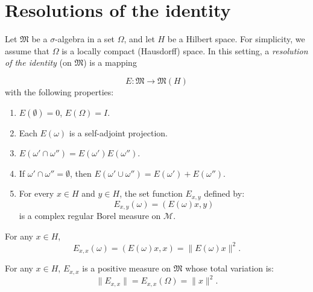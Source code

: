 \section{Resolutions of the identity}

\begin{definition}[12.17]
  Let $\mathfrak{M}$ be a $\sigma$-algebra in a set $\Omega$, and let $H$ be a Hilbert space.
  For simplicity, we assume that $\Omega$ is a locally compact (Hausdorff) space.
  In this setting, a \emph{resolution of the identity} (on $\mathfrak{M}$) is a mapping

  \[
    E: \mathfrak{M} \to \mathfrak{M}(H)
  \]
  with the following properties:

  \begin{enumerate}
    \item \label{itm:Ra} \( E(\emptyset) = 0\), \(E(\Omega) = I\).
    \item \label{itm:Rb}  Each \( E(\omega) \) is a self-adjoint projection.
    \item \label{itm:Rc} \( E(\omega' \cap \omega'') = E(\omega')E(\omega'')\).
    \item \label{itm:Rd}  If \( \omega' \cap \omega'' = \emptyset \), then \( E(\omega' \cup \omega'') = E(\omega') + E(\omega'') \).
    \item \label{itm:Re}  For every \( x \in H \) and \( y \in H \), the set function \( E_{x,y} \) defined by:
          \[
            E_{x,y}(\omega) = (E(\omega)x, y)
          \]
          is a complex regular Borel measure on \( \mathcal{M} \).
  \end{enumerate}
\end{definition}


\begin{lemma}
 For any $x \in H$,
 \[
  E_{x,x}(\omega) = (E(\omega)x, x) = \|E(\omega)x\|^2.
 \]
\end{lemma}

\begin{lemma}
 For any $x \in H$,
 \( E_{x,x} \) is a positive measure on \( \mathfrak{M} \) whose total variation is:
 \[
  \|E_{x,x}\| = E_{x,x}(\Omega) = \|x\|^2.
 \]
\end{lemma}

